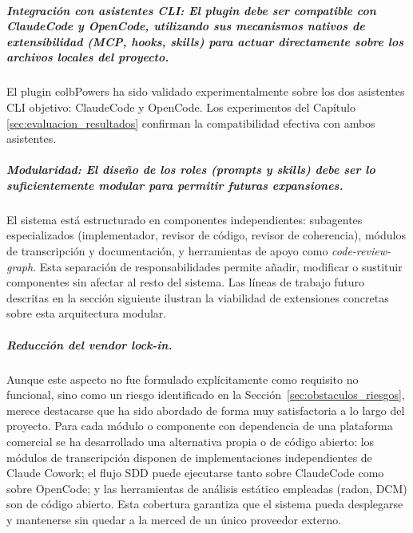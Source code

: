 \documentclass[11pt, letterpaper]{article}
\begin{document}
\subparagraph{Integración con asistentes CLI: El plugin debe ser compatible con ClaudeCode y OpenCode, utilizando sus mecanismos nativos de extensibilidad (MCP, hooks, skills) para actuar directamente sobre los archivos locales del proyecto.}
El plugin colbPowers ha sido validado experimentalmente sobre los dos asistentes CLI objetivo: ClaudeCode y OpenCode. Los experimentos del Capítulo \ref{sec:evaluacion_resultados} confirman la compatibilidad efectiva con ambos asistentes.

\subparagraph{Modularidad: El diseño de los roles (\textit{prompts} y \textit{skills}) debe ser lo suficientemente modular para permitir futuras expansiones.}
El sistema está estructurado en componentes independientes: subagentes especializados (implementador, revisor de código, revisor de coherencia), módulos de transcripción y documentación, y herramientas de apoyo como \textit{code-review-graph}. Esta separación de responsabilidades permite añadir, modificar o sustituir componentes sin afectar al resto del sistema. Las líneas de trabajo futuro descritas en la sección siguiente ilustran la viabilidad de extensiones concretas sobre esta arquitectura modular.

\subparagraph{Reducción del \textit{vendor lock-in}.}
Aunque este aspecto no fue formulado explícitamente como requisito no funcional, sino como un riesgo identificado en la Sección~\ref{sec:obstaculos_riesgos}, merece destacarse que ha sido abordado de forma muy satisfactoria a lo largo del proyecto. Para cada módulo o componente con dependencia de una plataforma comercial se ha desarrollado una alternativa propia o de código abierto: los módulos de transcripción disponen de implementaciones independientes de Claude Cowork; el flujo SDD puede ejecutarse tanto sobre ClaudeCode como sobre OpenCode; y las herramientas de análisis estático empleadas (radon, DCM) son de código abierto. Esta cobertura garantiza que el sistema pueda desplegarse y mantenerse sin quedar a la merced de un único proveedor externo.

\end{document}
